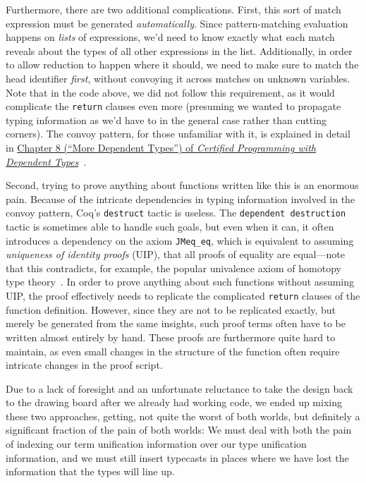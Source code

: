 Furthermore, there are two additional complications.
First, this sort of match expression must be generated \emph{automatically}.
Since pattern-matching evaluation happens on \emph{lists} of expressions, we'd need to know exactly what each match reveals about the types of all other expressions in the list.
Additionally, in order to allow reduction to happen where it should, we need to make sure to match the head identifier \emph{first}, without convoying it across matches on unknown variables.
Note that in the code above, we did not follow this requirement, as it would complicate the \texttt{return} clauses even more (presuming we wanted to propagate typing information as we'd have to in the general case rather than cutting corners).
The convoy pattern, for those unfamiliar with it, is explained in detail in \href{http://adam.chlipala.net/cpdt/html/Cpdt.MoreDep.html#lab54}{Chapter 8 (``More Dependent Types'') of \emph{Certified Programming with Dependent Types}}~\cite{cpdt}.

Second, trying to prove anything about functions written like this is an enormous pain.
Because of the intricate dependencies in typing information involved in the convoy pattern, Coq's \texttt{destruct} tactic is useless.
The \texttt{dependent destruction} tactic is sometimes able to handle such goals, but even when it can, it often introduces a dependency on the axiom \texttt{JMeq_eq}, which is equivalent to assuming \emph{uniqueness of identity proofs} (UIP), that all proofs of equality are equal---note that this contradicts, for example, the popular univalence axiom of homotopy type theory~\cite{HoTTBook}.
In order to prove anything about such functions without assuming UIP, the proof effectively needs to replicate the complicated \texttt{return} clauses of the function definition.
However, since they are not to be replicated exactly, but merely be generated from the same insights, such proof terms often have to be written almost entirely by hand.
These proofs are furthermore quite hard to maintain, as even small changes in the structure of the function often require intricate changes in the proof script.

Due to a lack of foresight and an unfortunate reluctance to take the design back to the drawing board after we already had working code, we ended up mixing these two approaches, getting, not quite the worst of both worlds, but definitely a significant fraction of the pain of both worlds:
We must deal with both the pain of indexing our term unification information over our type unification information, and we must still insert typecasts in places where we have lost the information that the types will line up.

